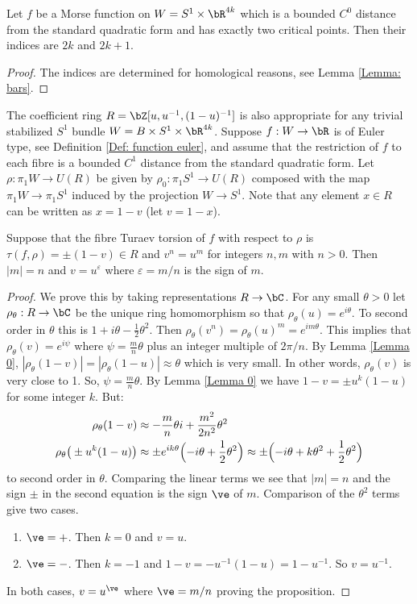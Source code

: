 \begin{lemma}\label{Lemma 0.0}
Let $f$ be a Morse function on $W=S^1\times \bR^{4k}$ which is a bounded $C^0$ distance from the standard quadratic form and has exactly two critical points. Then their indices are $2k$ and $2k+1$.
\end{lemma}

\begin{proof}
The indices are determined for homological reasons, see Lemma \ref{Lemma: bars}.
\end{proof}

The coefficient ring $R=\bZ[u,u^{-1},(1-u)^{-1}]$ is also appropriate for any trivial stabilized $S^1$ bundle $W=B\times S^1\times \bR^{4k}$. Suppose $f:W\to \bR$ is of Euler type, see Definition \ref{Def: function euler}, and assume that the restriction of $f$ to each fibre is a bounded $C^1$ distance from the standard quadratic form. Let $\rho:\pi_1W\to U(R)$ be given by $\rho_0:\pi_1S^1\to U(R)$ composed with the map $\pi_1W\to \pi_1S^1$ induced by the projection $W\to S^1$. Note that any element $x\in R$ can be written as $x=1-v$ (let $v=1-x$).

\begin{proposition}\label{prop: un=vm lemma}
Suppose that the fibre Turaev torsion of $f$ with respect to $\rho$ is $\tau(f,\rho)=\pm(1-v)\in R$ and $v^n=u^m$ for integers $n,m$ with $n>0$. Then $|m|=n$ and $v=u^\varepsilon$ where $\varepsilon=m/n$ is the sign of $m$.
\end{proposition}

\begin{proof}
We prove this by taking representations $R\to \bC$. For any small $\theta>0$ let \hbox{$\rho_\theta:R\to\bC$} be the unique ring homomorphism so that $\rho_\theta(u)=e^{i\theta}$. To second order in $\theta$ this is $1+i\theta-\frac12\theta^2$. Then $\rho_\theta(v^n)=\rho_\theta(u)^m=e^{im\theta}$. This implies that $\rho_\theta(v)=e^{i\psi}$ where $\psi=\frac mn\theta$ plus an integer multiple of $2\pi/n$. By Lemma \ref{Lemma 0}, $|\rho_\theta(1-v)|=|\rho_\theta(1-u)|\approx \theta$ which is very small. In other words, $\rho_\theta(v)$ is very close to 1. So, $\psi=\frac mn\theta$. By Lemma \ref{Lemma 0} we have $1-v= \pm u^k(1-u)$ for some integer $k$. But:
\begin{align*}
\rho_\theta(1-v)&\approx -\frac mn\theta i+\frac{m^2}{2n^2}\theta^2\\
\rho_\theta\big(\pm u^k (1-u)\big)&\approx \pm e^{ik\theta}\Bigl(
-i\theta +\frac12 \theta^2
\Bigr)\approx \pm \Bigl(
-i\theta +k\theta^2+\frac12\theta^2
\Bigr)
\end{align*}
to second order in $\theta$. Comparing the linear terms we see that $|m|= n$ and the sign $\pm$ in the second equation is the sign $\ve$ of $m$. Comparison of the $\theta^2$ terms give two cases.
\begin{enumerate}
\item $\ve=+$. Then $k=0$ and $v=u$.
\item $\ve=-$. Then $k=-1$ and $1-v=-u^{-1}(1-u)=1-u^{-1}$. So $v=u^{-1}$.
\end{enumerate}
In both cases, $v=u^\ve$ where $\ve=m/n$ proving the proposition.
\end{proof}

